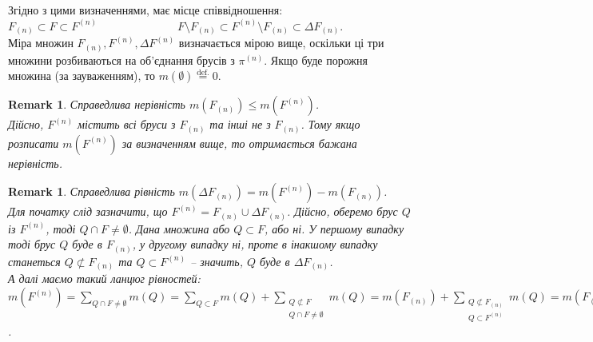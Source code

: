 \documentclass[a4paper, 10pt]{article}
\theoremstyle{theoremdd}
\theoremstyle{theoremdd}
\theoremstyle{theoremdd}
\theoremstyle{theoremdd}
\theoremstyle{theoremdd}
\theoremstyle{theoremdd}
\newtheorem{remark}[theorem]{Remark}
\theoremstyle{theoremdd}
\theoremstyle{theoremdd}
\begin{document}
Згідно з цими визначеннями, має місце співвідношення:\\
$F_{(n)} \subset F \subset F^{(n)} \hspace{3cm} F \setminus F_{(n)} \subset F^{(n)} \setminus F_{(n)} \subset \Delta F_{(n)}$.\\

Міра множин $F_{(n)}, F^{(n)}, \Delta F^{(n)}$ визначається мірою вище, оскільки ці три множини розбиваються на об'єднання брусів з $\pi^{(n)}$. Якщо буде порожня множина (за зауваженням), то $m(\emptyset) \overset{\text{def.}}{=} 0$.

\begin{remark}
Справедлива нерівність $m(F_{(n)}) \leq m(F^{(n)})$.\\
Дійсно, $F^{(n)}$ містить всі бруси з $F_{(n)}$ та інші не з $F_{(n)}$. Тому якщо розписати $m(F^{(n)})$ за визначенням вище, то отримається бажана нерівність.
\end{remark}

\begin{remark}
Справедлива рівність $m(\Delta F_{(n)}) = m(F^{(n)}) - m(F_{(n)})$. \\
Для початку слід зазначити, що $F^{(n)} = F_{(n)} \cup \Delta F_{(n)}$. Дійсно, оберемо брус $Q$ із $F^{(n)}$, тоді $Q \cap F \neq \emptyset$. Дана множина або $Q \subset F$, або ні. У першому випадку тоді брус $Q$ буде в $F_{(n)}$, у другому випадку ні, проте в інакшому випадку станеться $Q \not\subset F_{(n)}$ та $Q \subset F^{(n)}$ -- значить, $Q$ буде в $\Delta F_{(n)}$.\\
А далі маємо такий ланцюг рівностей:\\
$m(F^{(n)}) = \displaystyle\sum_{Q \cap F \neq \emptyset} m(Q) = \sum_{Q \subset F} m(Q) + \sum_{\substack{Q \not\subset F \\ Q \cap F \neq \emptyset}} m(Q) = m(F_{(n)}) + \sum_{\substack{Q \not\subset F_{(n)} \\ Q \subset F^{(n)}}} m(Q) = m(F_{(n)}) + m(\Delta F_{(n)})$.
\end{remark}
\end{document}
